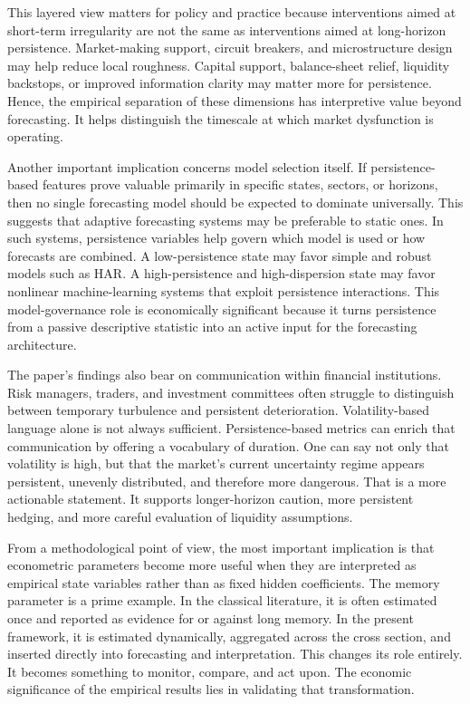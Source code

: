 \documentclass[12pt]{article}
\begin{document}
This layered view matters for policy and practice because interventions aimed at short-term irregularity are not the same as interventions aimed at long-horizon persistence. Market-making support, circuit breakers, and microstructure design may help reduce local roughness. Capital support, balance-sheet relief, liquidity backstops, or improved information clarity may matter more for persistence. Hence, the empirical separation of these dimensions has interpretive value beyond forecasting. It helps distinguish the timescale at which market dysfunction is operating.

Another important implication concerns model selection itself. If persistence-based features prove valuable primarily in specific states, sectors, or horizons, then no single forecasting model should be expected to dominate universally. This suggests that adaptive forecasting systems may be preferable to static ones. In such systems, persistence variables help govern which model is used or how forecasts are combined. A low-persistence state may favor simple and robust models such as HAR. A high-persistence and high-dispersion state may favor nonlinear machine-learning systems that exploit persistence interactions. This model-governance role is economically significant because it turns persistence from a passive descriptive statistic into an active input for the forecasting architecture.

The paper's findings also bear on communication within financial institutions. Risk managers, traders, and investment committees often struggle to distinguish between temporary turbulence and persistent deterioration. Volatility-based language alone is not always sufficient. Persistence-based metrics can enrich that communication by offering a vocabulary of duration. One can say not only that volatility is high, but that the market's current uncertainty regime appears persistent, unevenly distributed, and therefore more dangerous. That is a more actionable statement. It supports longer-horizon caution, more persistent hedging, and more careful evaluation of liquidity assumptions.

From a methodological point of view, the most important implication is that econometric parameters become more useful when they are interpreted as empirical state variables rather than as fixed hidden coefficients. The memory parameter is a prime example. In the classical literature, it is often estimated once and reported as evidence for or against long memory. In the present framework, it is estimated dynamically, aggregated across the cross section, and inserted directly into forecasting and interpretation. This changes its role entirely. It becomes something to monitor, compare, and act upon. The economic significance of the empirical results lies in validating that transformation.
\end{document}
